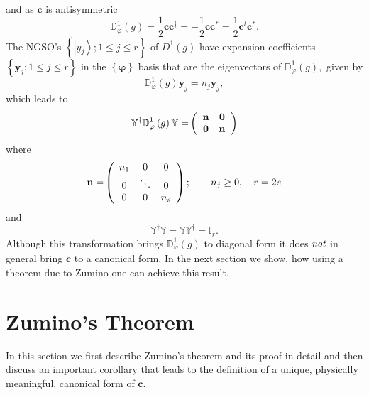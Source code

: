 \documentclass[preprint,aps,showkeys]{revtex4}%
\begin{document}
and as $\mathbf{c}$ is antisymmetric
\begin{equation}
\mathbb{D}_{\varphi}^{1}\left(  g\right)  =\frac{1}{2}\mathbf{cc}^{\dagger
}=-\frac{1}{2}\mathbf{cc}^{\ast}=\frac{1}{2}\mathbf{c}^{t}\mathbf{c}^{\ast}.
\end{equation}
The NGSO's $\left\{  \left\vert y_{j}\right\rangle ;1\leq j\leq r\right\}  $
of $D^{1}\left(  g\right)  $ have expansion coefficients $\left\{
\mathbf{y}_{j};1\leq j\leq r\right\}  $ in the $\left\{  \mathbf{\varphi
}\right\}  $ basis that are the eigenvectors of $\mathbb{D}_{\varphi}%
^{1}\left(  g\right)  ,$ given by
\begin{equation}
\mathbb{D}_{\varphi}^{1}\left(  g\right)  \mathbf{y}_{j}=n_{j}\mathbf{y}_{j},
\end{equation}
which leads to
\begin{equation}
\mathbb{Y}^{\dagger}\mathbb{D}_{\varphi}^{1}\left(  g\right)  \mathbb{Y=}%
\left(
\begin{array}
[c]{cc}%
\mathbf{n} & \mathbf{0}\\
\mathbf{0} & \mathbf{n}%
\end{array}
\right)
\end{equation}
where
\begin{equation}
\mathbf{n=}\left(
\begin{array}
[c]{ccc}%
n_{1} & 0 & 0\\
0 & \ddots & 0\\
0 & 0 & n_{s}%
\end{array}
\right)  ;\qquad n_{j}\geq0,\quad r=2s
\end{equation}
and
\begin{equation}
\mathbb{Y}^{\dagger}\mathbb{Y}=\mathbb{YY}^{\dagger}=\mathbb{I}_{r}.
\end{equation}
Although this transformation brings $\mathbb{D}_{\varphi}^{1}\left(  g\right)
$ to diagonal form it does $\emph{not}$ in general bring $\mathbf{c}$ to a
canonical form. In the next section we show, how using a theorem due to Zumino
\cite{Zumino62} one can achieve this result.

\section{Zumino's Theorem\label{zumino}}

In this section we first describe Zumino's theorem and its proof in detail and
then discuss an important corollary that leads to the definition of a unique,
physically meaningful, canonical form of $\mathbf{c.}$
\end{document}
